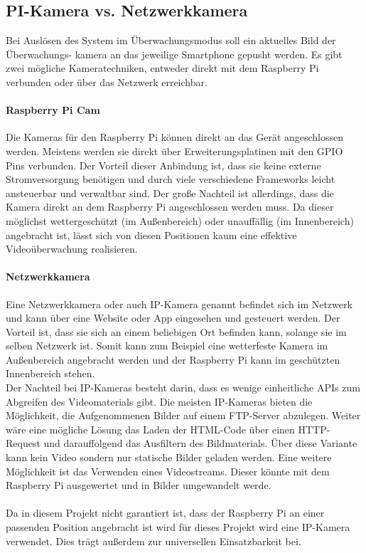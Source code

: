 \subsection{PI-Kamera vs. Netzwerkkamera}
Bei Auslösen des System im Überwachungsmodus soll ein aktuelles Bild der  Überwachungs- kamera an das jeweilige Smartphone gepusht werden. Es gibt zwei mögliche Kameratechniken, entweder direkt mit dem Raspberry Pi verbunden oder über das Netzwerk erreichbar.
\paragraph{Raspberry Pi Cam} 
Die Kameras für den Raspberry Pi können direkt an das Gerät angeschlossen werden. Meistens werden sie direkt über Erweiterungsplatinen mit den GPIO Pins verbunden. Der Vorteil dieser Anbindung ist, dass sie keine externe Stromversorgung benötigen und durch viele verschiedene Frameworks leicht ansteuerbar und verwaltbar sind. Der große Nachteil ist allerdings, dass die Kamera direkt an dem Raspberry Pi angeschlossen werden muss. Da dieser möglichst wettergeschützt (im Außenbereich) oder unauffällig (im Innenbereich) angebracht ist, lässt sich von diesen Positionen kaum eine effektive Videoüberwachung realisieren.
\paragraph{Netzwerkkamera} 
Eine Netzwerkkamera oder auch IP-Kamera genannt befindet sich im Netzwerk und kann über eine Website oder App eingesehen und gesteuert werden. Der Vorteil ist, dass sie sich an einem beliebigen Ort befinden kann, solange sie im selben Netzwerk ist. Somit kann zum Beispiel eine wetterfeste Kamera im Außenbereich angebracht werden und der Raspberry Pi kann im geschützten Innenbereich stehen. \\
Der Nachteil bei IP-Kameras besteht darin, dass es wenige einheitliche APIs zum Abgreifen des Videomaterials gibt. Die meisten IP-Kameras bieten die Möglichkeit, die Aufgenommenen Bilder auf einem FTP-Server abzulegen. Weiter wäre eine mögliche Lösung das Laden der HTML-Code über einen HTTP-Request und darauffolgend das Ausfiltern des Bildmaterials. Über diese Variante kann kein Video sondern nur statische Bilder geladen werden. Eine weitere Möglichkeit ist das Verwenden eines Videostreams. Dieser könnte mit dem Raspberry Pi ausgewertet und in Bilder umgewandelt werde.
 \\\\
Da in diesem Projekt nicht garantiert ist, dass der Raspberry Pi an einer passenden Position angebracht ist wird für dieses Projekt wird eine IP-Kamera verwendet. Dies trägt außerdem zur universellen Einsatzbarkeit bei.

